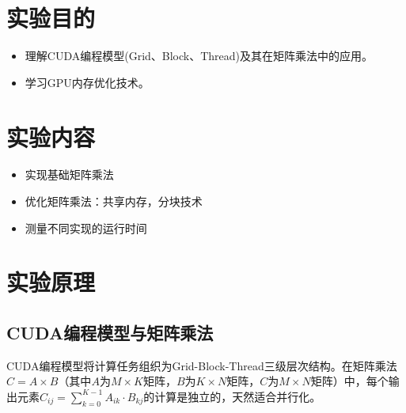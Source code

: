 \documentclass{SYSUReport}
\date{2025年6月13日}
\begin{document}
\cover
\thispagestyle{empty} %
\clearpage



\section{实验目的}
\begin{itemize}
    \item 理解CUDA编程模型(Grid、Block、Thread)及其在矩阵乘法中的应用。
    \item 学习GPU内存优化技术。
\end{itemize}

\section{实验内容}
\begin{itemize}
\item 实现基础矩阵乘法
\item 优化矩阵乘法：共享内存，分块技术
\item 测量不同实现的运行时间
\end{itemize}

\section{实验原理}

\subsection{CUDA编程模型与矩阵乘法}

CUDA编程模型将计算任务组织为Grid-Block-Thread三级层次结构。在矩阵乘法$C = A \times B$（其中$A$为$M\times K$矩阵，$B$为$K\times N$矩阵，$C$为$M\times N$矩阵）中，每个输出元素$C_{ij} = \sum_{k=0}^{K-1} A_{ik} \cdot B_{kj}$的计算是独立的，天然适合并行化。
\end{document}
